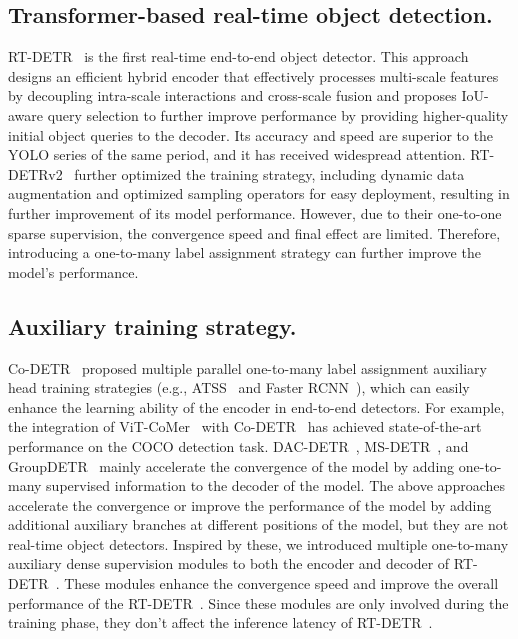 \documentclass[10pt,twocolumn,letterpaper]{article}
\begin{document}
\subsection{Transformer-based real-time object detection.}
RT-DETR~\cite{zhao2024rt-detr} is the first real-time end-to-end object detector. This approach designs an efficient hybrid encoder that effectively processes multi-scale features by decoupling intra-scale interactions and cross-scale fusion and proposes IoU-aware query selection to further improve performance by providing higher-quality initial object queries to the decoder. Its accuracy and speed are superior to the YOLO series of the same period, and it has received widespread attention. RT-DETRv2~\cite{lv2024rt-detrv2} further optimized the training strategy, including dynamic data augmentation and optimized sampling operators for easy deployment, resulting in further improvement of its model performance. However, due to their one-to-one sparse supervision, the convergence speed and final effect are limited. Therefore, introducing a one-to-many label assignment strategy can further improve the model's performance.

\subsection{Auxiliary training strategy.}
Co-DETR~\cite{zong2023co-detr} proposed multiple parallel one-to-many label assignment auxiliary head training strategies (e.g., ATSS~\cite{zhang2020ATSS} and Faster RCNN~\cite{ren2015faster-rcnn}), which can easily enhance the learning ability of the encoder in end-to-end detectors. For example, the integration of ViT-CoMer~\cite{xia2024vit-comer} with Co-DETR~\cite{zong2023co-detr} has achieved state-of-the-art performance on the COCO detection task. DAC-DETR~\cite{hu2024DAC-DETR}, MS-DETR~\cite{zhao2024ms-detr}, and GroupDETR~\cite{chen2023group-detr} mainly accelerate the convergence of the model by adding one-to-many supervised information to the decoder of the model. The above approaches accelerate the convergence or improve the performance of the model by adding additional auxiliary branches at different positions of the model, but they are not real-time object detectors. Inspired by these, we introduced multiple one-to-many auxiliary dense supervision modules to both the encoder and decoder of RT-DETR~\cite{zhao2024rt-detr}. These modules enhance the convergence speed and improve the overall performance of the RT-DETR~\cite{zhao2024rt-detr}. Since these modules are only involved during the training phase, they don't affect the inference latency of RT-DETR~\cite{zhao2024rt-detr}.
\end{document}
